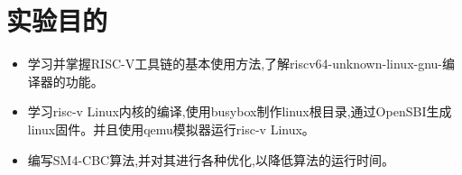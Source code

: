 \section{实验目的}
\begin{itemize}
    \item [1.] 学习并掌握RISC-V工具链的基本使用方法,了解riscv64-unknown-linux-gnu-编译器的功能。
    \item [2.] 学习risc-v Linux内核的编译,使用busybox制作linux根目录,通过OpenSBI生成linux固件。并且使用qemu模拟器运行risc-v Linux。
    \item [3.] 编写SM4-CBC算法,并对其进行各种优化,以降低算法的运行时间。
\end{itemize}